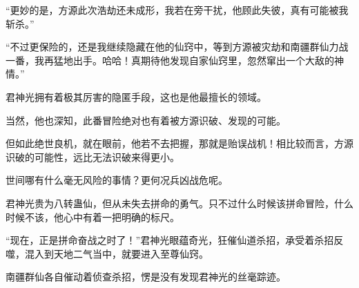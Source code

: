 \begin{this_body}
“更妙的是，方源此次浩劫还未成形，我若在旁干扰，他顾此失彼，真有可能被我斩杀。”

“不过更保险的，还是我继续隐藏在他的仙窍中，等到方源被灾劫和南疆群仙力战一番，我再猛地出手。哈哈！真期待他发现自家仙窍里，忽然窜出一个大敌的神情。”

君神光拥有着极其厉害的隐匿手段，这也是他最擅长的领域。

当然，他也深知，此番冒险绝对也有着被方源识破、发现的可能。

但如此绝世良机，就在眼前，他若不去把握，那就是贻误战机！相比较而言，方源识破的可能性，远比无法识破来得更小。

世间哪有什么毫无风险的事情？更何况兵凶战危呢。

君神光贵为八转蛊仙，但从未失去拼命的勇气。只不过什么时候该拼命冒险，什么时候不该，他心中有着一把明确的标尺。

“现在，正是拼命奋战之时了！”君神光眼蕴奇光，狂催仙道杀招，承受着杀招反噬，混入到天地二气当中，就要进入至尊仙窍。

南疆群仙各自催动着侦查杀招，愣是没有发现君神光的丝毫踪迹。

\end{this_body}

